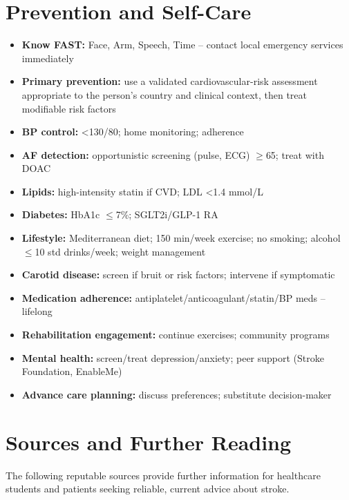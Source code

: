 \section*{Prevention and Self-Care}
\begin{itemize}
    \item \textbf{Know FAST:} Face, Arm, Speech, Time -- contact local emergency services immediately
    \item \textbf{Primary prevention:} use a validated cardiovascular-risk assessment appropriate to the person's country and clinical context, then treat modifiable risk factors
    \item \textbf{BP control:} <130/80; home monitoring; adherence
    \item \textbf{AF detection:} opportunistic screening (pulse, ECG) $\ge$65; treat with DOAC
    \item \textbf{Lipids:} high-intensity statin if CVD; LDL <1.4 mmol/L
    \item \textbf{Diabetes:} HbA1c $\le$7\%; SGLT2i/GLP-1 RA
    \item \textbf{Lifestyle:} Mediterranean diet; 150 min/week exercise; no smoking; alcohol $\le$10 std drinks/week; weight management
    \item \textbf{Carotid disease:} screen if bruit or risk factors; intervene if symptomatic
    \item \textbf{Medication adherence:} antiplatelet/anticoagulant/statin/BP meds -- lifelong
    \item \textbf{Rehabilitation engagement:} continue exercises; community programs
    \item \textbf{Mental health:} screen/treat depression/anxiety; peer support (Stroke Foundation, EnableMe)
    \item \textbf{Advance care planning:} discuss preferences; substitute decision-maker
\end{itemize}

\section*{Sources and Further Reading}
The following reputable sources provide further information for healthcare students and patients seeking reliable, current advice about stroke.

